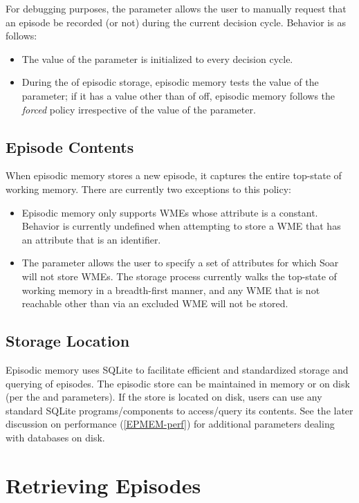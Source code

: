 For debugging purposes, the  parameter allows the user to manually request that an episode be recorded (or not) during the current decision cycle.  Behavior is as follows:

\begin{itemize}
\item The value of the  parameter is initialized to  every decision cycle.
\item During the  of episodic storage, episodic memory tests the value of the  parameter; if it has a value other than of off, episodic memory follows the \emph{forced} policy irrespective of the value of the  parameter.
\end{itemize}

\subsection{Episode Contents}
When episodic memory stores a new episode, it captures the entire top-state of working memory. There are currently two exceptions to this policy:

\begin{itemize}
\item Episodic memory only supports WMEs whose attribute is a constant. Behavior is currently undefined when attempting to store a WME that has an attribute that is an identifier.
\item The  parameter allows the user to specify a set of attributes for which Soar will not store WMEs. The storage process currently walks the top-state of working memory in a breadth-first manner, and any WME that is not reachable other than via an excluded WME will not be stored.
\end{itemize}

\subsection{Storage Location}
Episodic memory uses SQLite to facilitate efficient and standardized storage and querying of episodes.  The episodic store can be maintained in memory or on disk (per the  and  parameters).  If the store is located on disk, users can use any standard SQLite programs/components to access/query its contents. See the later discussion on performance (\ref{EPMEM-perf}) for additional parameters dealing with databases on disk.

\section{Retrieving Episodes}
\label{EPMEM-retrieval}

